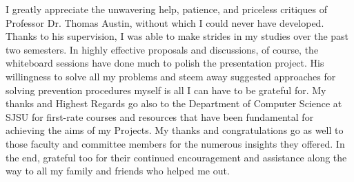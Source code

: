 I greatly appreciate the unwavering help, patience, and priceless critiques of
Professor Dr. Thomas Austin, without which I could never have developed. Thanks to his
supervision, I was able to make strides in my studies over the past two semesters. In
highly effective proposals and discussions, of course, the whiteboard sessions have done
much to polish the presentation project. His willingness to solve all my problems and
steem away suggested approaches for solving prevention procedures myself is all I can
have to be grateful for. My thanks and Highest Regards go also to the Department
of Computer Science at SJSU for first-rate courses and resources that have been
fundamental for achieving the aims of my Projects. My thanks and congratulations
go as well to those faculty and committee members for the numerous insights they
offered. In the end, grateful too for their continued encouragement and assistance
along the way to all my family and friends who helped me out.

